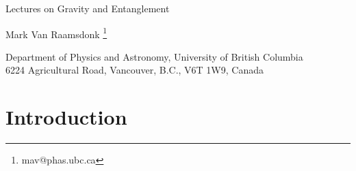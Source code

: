 \documentclass[12pt,epsf]{article}
\begin{document}
\begin{titlepage}
\hfill
\vbox{
    \halign{#\hfil         \cr
           } %
      }  %
\vspace*{20mm}
\begin{center}
{\Large  Lectures on Gravity and Entanglement}

\vspace*{15mm}
\vspace*{1mm}
Mark Van Raamsdonk
\vspace*{1cm}
\let\thefootnote\relax\footnote{mav@phas.ubc.ca}

{Department of Physics and Astronomy,
University of British Columbia\\
6224 Agricultural Road,
Vancouver, B.C., V6T 1W9, Canada\\
\vspace*{0.2cm}}

\vspace*{1cm}
\end{center}
\begin{abstract}
The AdS/CFT correspondence provides quantum theories of gravity in which spacetime and gravitational physics emerge from ordinary non-gravitational quantum systems with many degrees of freedom. Recent work in this context has uncovered fascinating connections between quantum information theory and quantum gravity, suggesting that spacetime geometry is directly related to the entanglement structure of the underlying quantum mechanical degrees of freedom and that aspects of spacetime dynamics (gravitation) can be understood from basic quantum information theoretic constraints. In these notes, we provide an elementary introduction to these developments, suitable for readers with some background in general relativity and quantum field theory. The notes are based on lectures given at the CERN Spring School 2014, the Jerusalem Winter School 2014, the TASI Summer School 2015, and the Trieste Spring School 2015.
\end{abstract}

\end{titlepage}

\vskip 1cm

\section{Introduction}
\end{document}
